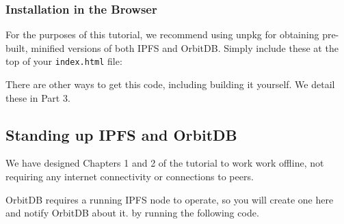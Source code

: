 \subsubsection{Installation in the
Browser}\label{installation-in-the-browser}

For the purposes of this tutorial, we recommend using unpkg for
obtaining pre-built, minified versions of both IPFS and OrbitDB. Simply
include these at the top of your \texttt{index.html} file:

\begin{Shaded}
\begin{Highlighting}[]
\end{Highlighting}
\end{Shaded}

There are other ways to get this code, including building it yourself.
We detail these in Part 3.

\subsection{Standing up IPFS and
OrbitDB}\label{standing-up-ipfs-and-orbitdb}

We have designed Chapters 1 and 2 of the tutorial to work work offline,
not requiring any internet connectivity or connections to peers.

OrbitDB requires a running IPFS node to operate, so you will create one
here and notify OrbitDB about it. by running the following code.

